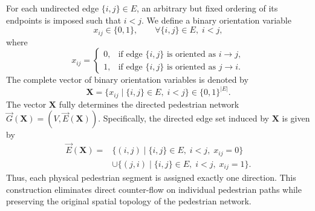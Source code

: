 \documentclass[twocolumn,a4paper]{article} %
\begin{document}
For each undirected edge \(\{i,j\}\in E\), an arbitrary but fixed ordering of its endpoints is imposed such that \(i<j\). We define a binary orientation variable
\begin{equation}
    x_{ij}\in\{0,1\}, \qquad \forall \{i,j\}\in E,\; i<j,
\end{equation}
where
\begin{equation}
x_{ij}=
\begin{cases}
0, & \text{if edge } \{i,j\} \text{ is oriented as } i\rightarrow j,\\
1, & \text{if edge } \{i,j\} \text{ is oriented as } j\rightarrow i.
\end{cases}
\end{equation}
The complete vector of binary orientation variables is denoted by
\begin{equation}
    \mathbf{X}
    =
    \{x_{ij}\mid \{i,j\}\in E,\; i<j\}
    \in \{0,1\}^{|E|}.
\end{equation}
The vector \(\mathbf{X}\) fully determines the directed pedestrian network $\vec{G}(\mathbf{X})=(V,\vec{E}(\mathbf{X}))$. Specifically, the directed edge set induced by \(\mathbf{X}\) is given by
\begin{equation}
\begin{aligned}
    \vec{E}(\mathbf{X})
    =
    &\{(i,j)\mid \{i,j\}\in E,\; i<j,\; x_{ij}=0\} \\
    &\cup
    \{(j,i)\mid \{i,j\}\in E,\; i<j,\; x_{ij}=1\}.
\end{aligned}
\end{equation}
Thus, each physical pedestrian segment is assigned exactly one direction. This construction eliminates direct counter-flow on individual pedestrian paths while preserving the original spatial topology of the pedestrian network.
\end{document}
